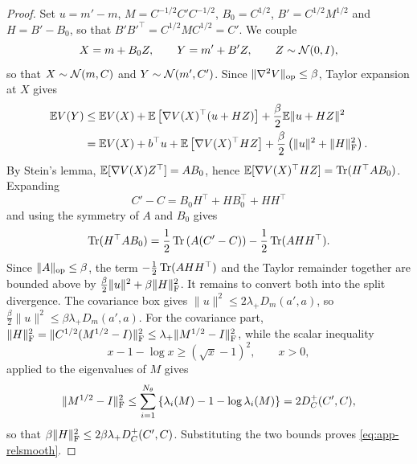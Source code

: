 \begin{proof}
    Set $u = m' - m$, $M = C^{-1/2} C' C^{-1/2}$, $B_0 = C^{1/2}$, $B' = C^{1/2} M^{1/2}$ and $H = B' - B_0$, so that $B' B'^\top = C^{1/2} M C^{1/2} = C'$. We couple
    \begin{equation*}
        X = m + B_0 Z, \qquad Y = m' + B' Z, \qquad Z \sim \mathcal{N} (0, I),
    \end{equation*}
    so that $X \sim \mathcal{N} (m, C)$ and $Y \sim \mathcal{N} (m', C')$. Since $\| \nabla^2 V \|_{\mathrm{op}} \leq \beta$, Taylor expansion at $X$ gives
    \begin{align*}
        \mathbb{E} V (Y) &\leq \mathbb{E} V (X) + \mathbb{E} \left[ \nabla V (X)^\top (u + HZ) \right] + \frac{\beta}{2} \mathbb{E} \| u + HZ \|^2 \\
        &= \mathbb{E} V (X) + b^\top u + \mathbb{E} \left[ \nabla V (X)^\top HZ \right] + \frac{\beta}{2} \left( \| u \|^2 + \| H \|_{\mathrm{F}}^2 \right).
    \end{align*}
    By Stein's lemma, $\mathbb{E} [\nabla V (X) Z^\top] = A B_0$, hence $\mathbb{E} [\nabla V (X)^\top HZ] = \operatorname{Tr} (H^\top A B_0)$. Expanding
    \begin{equation*}
        C' - C = B_0 H^\top + H B_0^\top + H H^\top
    \end{equation*}
    and using the symmetry of $A$ and $B_0$ gives
    \begin{equation*}
        \operatorname{Tr} (H^\top A B_0) = \frac{1}{2} \operatorname{Tr} \left( A (C' - C) \right) - \frac{1}{2} \operatorname{Tr} (A H H^\top).
    \end{equation*}
    Since $\| A \|_{\mathrm{op}} \leq \beta$, the term $-\frac12 \operatorname{Tr} (AHH^\top)$ and the Taylor remainder together are bounded above by $\frac{\beta}{2} \| u \|^2 + \beta \| H \|_{\mathrm{F}}^2$. It remains to convert both into the split divergence. The covariance box gives $\| u \|^2 \leq 2 \lambda_+ D_m (a', a)$, so $\frac{\beta}{2} \| u \|^2 \leq \beta \lambda_+ D_m (a', a)$. For the covariance part, $\| H \|_{\mathrm{F}}^2 = \| C^{1/2} (M^{1/2} - I) \|_{\mathrm{F}}^2 \leq \lambda_+ \| M^{1/2} - I \|_{\mathrm{F}}^2$, while the scalar inequality
    \begin{equation*}
        x - 1 - \log x \geq (\sqrt{x} - 1)^2, \qquad x > 0,
    \end{equation*}
    applied to the eigenvalues of $M$ gives
    \begin{equation*}
        \| M^{1/2} - I \|_{\mathrm{F}}^2 \leq \sum_{i=1}^{N_\theta} \left\{ \lambda_i (M) - 1 - \log \lambda_i (M) \right\} = 2 D_C^+ (C', C),
    \end{equation*}
    so that $\beta \| H \|_{\mathrm{F}}^2 \leq 2 \beta \lambda_+ D_C^+ (C', C)$. Substituting the two bounds proves \eqref{eq:app-relsmooth}.
\end{proof}

